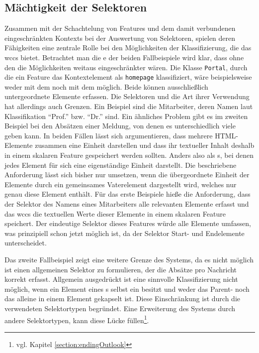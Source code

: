 \subsection{Mächtigkeit der Selektoren}
    \label{section:discussionInterpretationSelectors}
    Zusammen mit der Schachtelung von Features und dem
    damit verbundenen eingeschränkten Kontexts bei der
    Auswertung von Selektoren,
    spielen deren Fähigkeiten eine zentrale Rolle bei den
    Möglichkeiten der Klassifizierung, die das \gls{wccs} bietet.
    Betrachtet man die {\classificationModel}e der beiden Fallbeispiele wird klar,
    dass ohne den {\xpathSelector} die Möglichkeiten weitaus eingeschränkter wären.
    Die Klasse \texttt{Portal}, durch die ein Feature das Kontextelement
    als {} \texttt{homepage} klassifiziert,
    wäre beispielsweise weder mit dem {\cssSelector}
    noch mit dem {\urlSelector} möglich.
    Beide können ausschließlich untergeordnete Elemente erfassen.
    Die Selektoren und die Art ihrer Verwendung hat allerdings auch Grenzen.
    Ein Beispiel sind die Mitarbeiter, deren Namen laut Klassifikation
    "`Prof."' bzw. "`Dr."' sind.
    Ein ähnliches Problem gibt es im zweiten Beispiel bei den Absätzen einer Meldung,
    von denen es unterschiedlich viele geben kann.
    In beiden Fällen lässt sich argumentieren,
    dass mehrere HTML-Elemente zusammen eine Einheit darstellen
    und dass ihr textueller Inhalt deshalb
    in einem skalaren Feature gespeichert werden sollten.
    Anders also als {\collectionFeature}s,
    bei denen jedes Element für sich eine eigenständige Einheit darstellt.
    Die beschriebene Anforderung lässt sich bisher nur umsetzen,
    wenn die übergeordnete Einheit der Elemente durch ein gemeinsames
    Vaterelement dargestellt wird, welches nur genau diese Element enthält.
    Für das erste Beispiele hieße die Anforderung, dass der Selektor des Namens eines Mitarbeiters
    alle relevanten Elemente erfasst und
    das \gls{wccs} die textuellen Werte dieser Elemente
    in einem skalaren Feature speichert.
    Der eindeutige Selektor dieses Features würde alle Elemente umfassen,
    was prinzipiell schon jetzt möglich ist,
    da der Selektor Start- und Endelemente unterscheidet.

    Das zweite Fallbeispiel zeigt eine weitere Grenze des Systems,
    da es nicht möglich ist einen allgemeinen Selektor zu formulieren,
    der die Absätze pro Nachricht korrekt
    erfasst.
    Allgemein ausgedrückt ist eine sinnvolle Klassifizierung nicht möglich,
    wenn ein Element eines {\collectionFeature}s selbst ein {\collectionFeature} besitzt
    und weder das Parent- noch das {\childFeature} alleine in einem Element gekapselt ist.
    Diese Einschränkung ist durch die verwendeten Selektortypen begründet.
    Eine Erweiterung des Systems durch andere Selektortypen, kann diese Lücke
    füllen\footnote{vgl. Kapitel \ref{section:endingOutlook}}.

